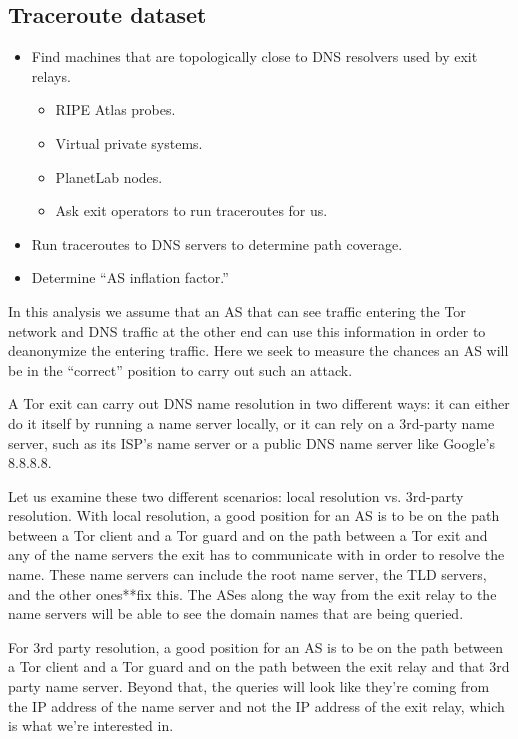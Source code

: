 \subsection{Traceroute dataset}
\label{sec:traceroute-dataset}
\begin{itemize}
	\item Find machines that are topologically close to DNS resolvers
		used by exit relays.
	\begin{itemize}
		\item RIPE Atlas probes.
		\item Virtual private systems.
		\item PlanetLab nodes.
		\item Ask exit operators to run traceroutes for us.
	\end{itemize}
	\item Run traceroutes to DNS servers to determine path coverage.
	\item Determine ``AS inflation factor.''
\end{itemize}

In this analysis we assume that an AS that can see traffic entering the Tor network and 
DNS traffic at the other end can use this information in order to deanonymize the 
entering traffic. Here we seek to measure the chances an AS will be in the ``correct'' 
position to carry out such an attack.

A Tor exit can carry out DNS name resolution in two different ways: it can either do it
itself by running a name server locally, or it can rely on a 3rd-party name server, 
such as its ISP's name server or a public DNS name server like Google's 8.8.8.8.

Let us examine these two different scenarios: local resolution vs. 3rd-party 
resolution. With local resolution, a good position for an AS is to be on the path between 
a Tor client and a Tor guard and on the path between a Tor exit and any of the name 
servers the exit has to communicate with in order to resolve the name. These name servers 
can include the root name server, the TLD servers, and the other ones**fix this. The ASes 
along the way from the exit relay to the name servers will be able to see the domain 
names that are being queried.

For 3rd party resolution, a good position for an AS is to be on the path between 
a Tor client and a Tor guard and on the path between the exit relay and that 3rd party 
name server. Beyond that, the queries will look like they're coming from the IP address 
of the name server and not the IP address of the exit relay, which is what we're interested 
in.


